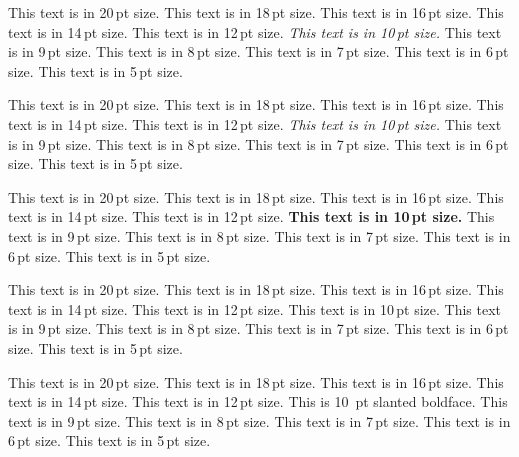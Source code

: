 {{\nopagebreak
{\twentyit \fontss This text is in 20\,pt size.}
{\eighteenit \fontss This text is in 18\,pt size.}
{\sixteenit \fontss This text is in 16\,pt size.}
{\fourteenit \fontss This text is in 14\,pt size.}
{\twelveit \fontss This text is in 12\,pt size.}
{\it \fontss This text is in 10\,pt size.}
{\nineit \fontss This text is in 9\,pt size.}
{\eightit \fontss This text is in 8\,pt size.}
{\sevenit \fontss This text is in 7\,pt size.}
{\sixit \fontss This text is in 6\,pt size.}
{\fiveit \fontss This text is in 5\,pt size.}
\

\nopagebreak
{\twentysl \fontss This text is in 20\,pt size.}
{\eighteensl \fontss This text is in 18\,pt size.}
{\sixteensl \fontss This text is in 16\,pt size.}
{\fourteensl \fontss This text is in 14\,pt size.}
{\twelvesl \fontss This text is in 12\,pt size.}
{\sl \fontss This text is in 10\,pt size.}
{\ninesl \fontss This text is in 9\,pt size.}
{\eightsl \fontss This text is in 8\,pt size.}
{\sevensl \fontss This text is in 7\,pt size.}
{\sixsl \fontss This text is in 6\,pt size.}
{\fivesl \fontss This text is in 5\,pt size.}
\

\newpage
{}\nopagebreak
{\twentybf \fontss This text is in 20\,pt size.}
{\eighteenbf \fontss This text is in 18\,pt size.}
{\sixteenbf \fontss This text is in 16\,pt size.}
{\fourteenbf \fontss This text is in 14\,pt size.}
{\twelvebf \fontss This text is in 12\,pt size.}
{\bf \fontss This text is in 10\,pt size.}
{\ninebf \fontss This text is in 9\,pt size.}
{\eightbf \fontss This text is in 8\,pt size.}
{\sevenbf \fontss This text is in 7\,pt size.}
{\sixbf \fontss This text is in 6\,pt size.}
{\fivebf \fontss This text is in 5\,pt size.}
\

\nopagebreak
{\twentyitbf \fontss This text is in 20\,pt size.}
{\eighteenitbf \fontss This text is in 18\,pt size.}
{\sixteenitbf \fontss This text is in 16\,pt size.}
{\fourteenitbf \fontss This text is in 14\,pt size.}
{\twelveitbf \fontss This text is in 12\,pt size.}
{\itbf \fontss This text is in 10\,pt size.}
{\nineitbf \fontss This text is in 9\,pt size.}
{\eightitbf \fontss This text is in 8\,pt size.}
{\sevenitbf \fontss This text is in 7\,pt size.}
{\sixitbf \fontss This text is in 6\,pt size.}
{\fiveitbf \fontss This text is in 5\,pt size.}
\

\nopagebreak
{\twentyslbf \fontss This text is in 20\,pt size.}
{\eighteenslbf \fontss This text is in 18\,pt size.}
{\sixteenslbf \fontss This text is in 16\,pt size.}
{\fourteenslbf \fontss This text is in 14\,pt size.}
{\twelveslbf \fontss This text is in 12\,pt size.}
{\slbf \fontss This is 10 \,pt slanted boldface.}
{\nineslbf \fontss This text is in 9\,pt size.}
{\eightslbf \fontss This text is in 8\,pt size.}
{\sevenslbf \fontss This text is in 7\,pt size.}
{\sixslbf \fontss This text is in 6\,pt size.}
{\fiveslbf \fontss This text is in 5\,pt size.}
\

}}
